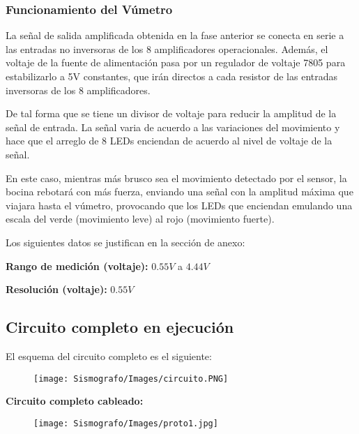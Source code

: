 \documentclass[12pt]{article}
\begin{document}
            
            
            \newpage
            
            
            
	        \subsubsection{Funcionamiento del Vúmetro}
	        La señal de salida amplificada obtenida en la fase anterior se conecta en serie a las entradas no inversoras de los 8 amplificadores operacionales. Además, el voltaje de la fuente de alimentación pasa por un regulador de voltaje 7805 para estabilizarlo a 5V constantes, que irán directos a cada resistor de las entradas inversoras de los 8 amplificadores.
	        
	        De tal forma que se tiene un divisor de voltaje para reducir la amplitud de la señal de entrada. La señal varia de acuerdo a las variaciones del movimiento y hace que el arreglo de 8 LEDs enciendan de acuerdo al nivel de voltaje de la señal.
	        
	        En este caso, mientras más brusco sea el movimiento detectado por el sensor, la bocina rebotará con más fuerza, enviando una señal con la amplitud máxima que viajara hasta el vúmetro, provocando que los LEDs que enciendan emulando una escala del verde (movimiento leve) al rojo (movimiento fuerte).
	        
	        Los siguientes datos se justifican en la sección de anexo: 
	        
	        \textbf{Rango de medición (voltaje):} $0.55 V$ a $4.44 V$
	        
	        \textbf{Resolución (voltaje):} $0.55 V$
	        
	        \subsection{Circuito completo en ejecución}
	        El esquema del circuito completo es el siguiente:
	        \begin{figure}[h!]
                \centering
                \texttt{[image: Sismografo/Images/circuito.PNG]}
            \end{figure} 
            \newpage
            \textbf{Circuito completo cableado:}
            \begin{figure}[h!]
                \centering
                \texttt{[image: Sismografo/Images/proto1.jpg]}
            \end{figure} 
            
\end{document}
